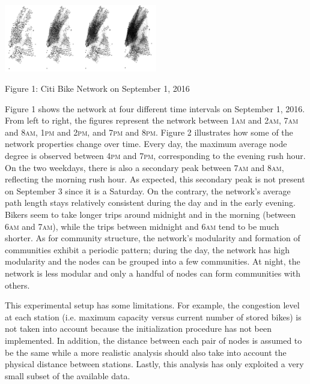 \documentclass[times, 10pt,twocolumn]{article}
\begin{document}
\centerline{\includegraphics[width=0.5\textwidth]{m2/combined.jpg}}
\centerline{Figure 1: Citi Bike Network on September 1, 2016}

Figure 1 shows the network at four different time intervals on September 1, 2016. From left to right, the figures represent the network between 1\textsc{am} and 2\textsc{am}, 7\textsc{am} and 8\textsc{am}, 1\textsc{pm} and 2\textsc{pm}, and 7\textsc{pm} and 8\textsc{pm}. Figure 2 illustrates how some of the network properties change over time. Every day, the maximum average node degree is observed between 4\textsc{pm} and 7\textsc{pm}, corresponding to the evening rush hour. On the two weekdays, there is also a secondary peak between 7\textsc{am} and 8\textsc{am}, reflecting the morning rush hour. As expected, this secondary peak is not present on September 3 since it is a Saturday. On the contrary, the network's average path length stays relatively consistent during the day and in the early evening. Bikers seem to take longer trips around midnight and in the morning (between 6\textsc{am} and 7\textsc{am}), while the trips between midnight and 6\textsc{am} tend to be much shorter. As for community structure, the network's modularity and formation of communities exhibit a periodic pattern; during the day, the network has high modularity and the nodes can be grouped into a few communities. At night, the network is less modular and only a handful of nodes can form communities with others.

This experimental setup has some limitations. For example, the congestion level at each station (i.e. maximum capacity versus current number of stored bikes) is not taken into account because the initialization procedure has not been implemented. In addition, the distance between each pair of nodes is assumed to be the same while a more realistic analysis should also take into account the physical distance between stations. Lastly, this analysis has only exploited a very small subset of the available data.
\end{document}

